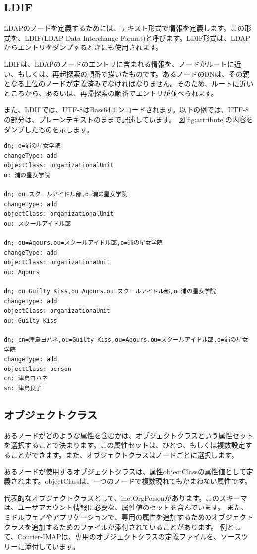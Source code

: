 \subsection{LDIF}

LDAPのノードを定義するためには、テキスト形式で情報を定義します。この形式を、LDIF(LDAP Data Interchange Format)と呼びます。LDIF形式は、LDAPからエントリをダンプするときにも使用されます。

LDIFは、LDAPのノードのエントリに含まれる情報を、ノードがルートに近い、もしくは、再起探索の順番で描いたものです。あるノードのDNは、その親となる上位のノードが定義済みでなければなりません。そのため、ルートに近いところから、あるいは、再帰探索の順番でエントリが並べられます。

また、LDIFでは、UTF-8はBase64エンコードされます。以下の例では、UTF-8の部分は、プレーンテキストのままで記述しています。
図\ref{fig:attribute}の内容をダンプしたものを示します。
\begin{verbatim}
dn; o=浦の星女学院
changeType: add
objectClass: organizationalUnit
o: 浦の星女学院

dn; ou=スクールアイドル部,o=浦の星女学院
changeType: add
objectClass: organizationalUnit
ou: スクールアイドル部

dn; ou=Aqours.ou=スクールアイドル部,o=浦の星女学院
changeType: add
objectClass: organizationaUnit
ou: Aqours

dn; ou=Guilty Kiss,ou=Aqours.ou=スクールアイドル部,o=浦の星女学院
changeType: add
objectClass: organizationaUnit
ou: Guilty Kiss

dn; cn=津島ヨハネ,ou=Guilty Kiss,ou=Aqours.ou=スクールアイドル部,o=浦の星女学院
changeType: add
objectClass: person
cn: 津島ヨハネ
sn: 津島良子
\end{verbatim}

\subsection{オブジェクトクラス}

あるノードがどのような属性を含むかは、オブジェクトクラスという属性セットを選択することで決まります。この属性セットは、ひとつ、もしくは複数設定することができます。また、オブジェクトクラスはノードごとに選択します。

あるノードが使用するオブジェクトクラスは、属性objectClassの属性値として定義されます。objectClassは、一つのノードで複数現れてもかまわない属性です。

代表的なオブジェクトクラスとして、inetOrgPersonがあります。このスキーマは、ユーザアカウント情報に必要な、属性値のセットを含んでいます。
また、ミドルウェアやアプリケーションで、専用の属性を追加するためのオブジェクトクラスを追加するためのファイルが添付されていることがあります。
例として、Courier-IMAPは、専用のオブジェクトクラスの定義ファイルを、ソースツリーに添付しています。


